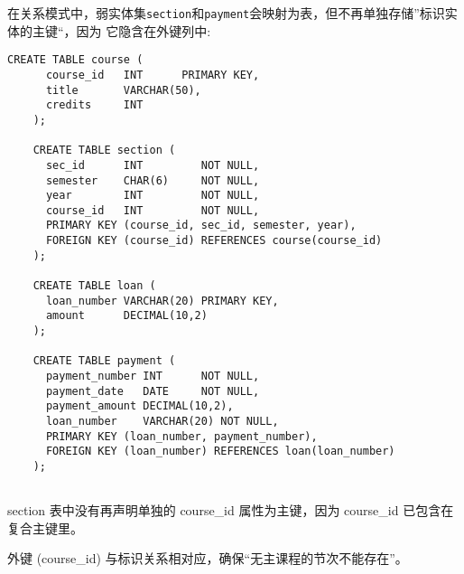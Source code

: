 在关系模式中，弱实体集\texttt{section}和\texttt{payment}会映射为表，但不再单独存储”标识实体的主键“，因为
它隐含在外键列中:
\begin{lstlisting}[style=sqlstyle]
    CREATE TABLE course (
      course_id   INT      PRIMARY KEY,
      title       VARCHAR(50),
      credits     INT
    );
    
    CREATE TABLE section (
      sec_id      INT         NOT NULL,
      semester    CHAR(6)     NOT NULL,
      year        INT         NOT NULL,
      course_id   INT         NOT NULL, 
      PRIMARY KEY (course_id, sec_id, semester, year),
      FOREIGN KEY (course_id) REFERENCES course(course_id)
    );
    
    CREATE TABLE loan (
      loan_number VARCHAR(20) PRIMARY KEY,
      amount      DECIMAL(10,2)
    );
    
    CREATE TABLE payment (
      payment_number INT      NOT NULL,  
      payment_date   DATE     NOT NULL,
      payment_amount DECIMAL(10,2),
      loan_number    VARCHAR(20) NOT NULL,  
      PRIMARY KEY (loan_number, payment_number),
      FOREIGN KEY (loan_number) REFERENCES loan(loan_number)
    );
        
\end{lstlisting}

section 表中没有再声明单独的 course\_id 属性为主键，因为 course\_id 已包含在复合主键里。

外键 (course\_id) 与标识关系相对应，确保“无主课程的节次不能存在”。